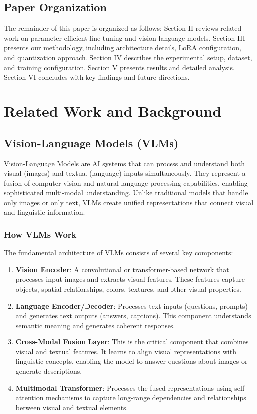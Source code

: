 \documentclass[conference]{IEEEtran}
\begin{document}
\subsection{Paper Organization}

The remainder of this paper is organized as follows: Section II reviews related work on parameter-efficient fine-tuning and vision-language models. Section III presents our methodology, including architecture details, LoRA configuration, and quantization approach. Section IV describes the experimental setup, dataset, and training configuration. Section V presents results and detailed analysis. Section VI concludes with key findings and future directions.

\section{Related Work and Background}

\subsection{Vision-Language Models (VLMs)}

Vision-Language Models are AI systems that can process and understand both visual (images) and textual (language) inputs simultaneously. They represent a fusion of computer vision and natural language processing capabilities, enabling sophisticated multi-modal understanding. Unlike traditional models that handle only images or only text, VLMs create unified representations that connect visual and linguistic information.

\subsubsection{How VLMs Work}

The fundamental architecture of VLMs consists of several key components:

\begin{enumerate}
    \item \textbf{Vision Encoder}: A convolutional or transformer-based network that processes input images and extracts visual features. These features capture objects, spatial relationships, colors, textures, and other visual properties.
    
    \item \textbf{Language Encoder/Decoder}: Processes text inputs (questions, prompts) and generates text outputs (answers, captions). This component understands semantic meaning and generates coherent responses.
    
    \item \textbf{Cross-Modal Fusion Layer}: This is the critical component that combines visual and textual features. It learns to align visual representations with linguistic concepts, enabling the model to answer questions about images or generate descriptions.
    
    \item \textbf{Multimodal Transformer}: Processes the fused representations using self-attention mechanisms to capture long-range dependencies and relationships between visual and textual elements.
\end{enumerate}
\end{document}
